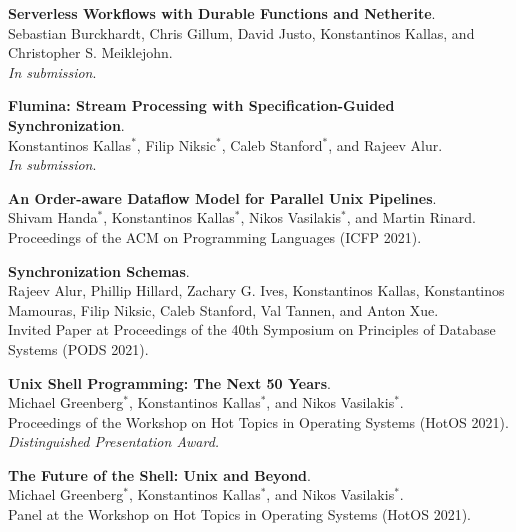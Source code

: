 \begin{minipage}{\textwidth}
\textbf{Serverless Workflows with Durable Functions and Netherite}. \\
Sebastian Burckhardt, Chris Gillum, David Justo, Konstantinos Kallas, and Christopher S. Meiklejohn. \\
\emph{In submission}.
\end{minipage}

\begin{minipage}{\textwidth}
\textbf{Flumina: Stream Processing with Specification-Guided Synchronization}. \\
Konstantinos Kallas$^*$, Filip Niksic$^*$, Caleb Stanford$^*$, and Rajeev Alur. \\
\emph{In submission}.
\end{minipage}

\begin{minipage}{\textwidth}
\textbf{An Order-aware Dataflow Model for Parallel Unix Pipelines}. \\
Shivam Handa$^*$, Konstantinos Kallas$^*$, Nikos Vasilakis$^*$, and Martin Rinard. \\
Proceedings of the ACM on Programming Languages (ICFP 2021).
\end{minipage}

\begin{minipage}{\textwidth}
\textbf{Synchronization Schemas}. \\
Rajeev Alur, Phillip Hillard, Zachary G. Ives, Konstantinos Kallas, Konstantinos Mamouras, Filip Niksic, Caleb Stanford, Val Tannen, and Anton Xue. \\
Invited Paper at Proceedings of the 40th Symposium on Principles of Database Systems (PODS 2021).
\end{minipage}

\begin{minipage}{\textwidth}
\textbf{Unix Shell Programming: The Next 50 Years}. \\
Michael Greenberg$^*$, Konstantinos Kallas$^*$, and Nikos Vasilakis$^*$. \\
Proceedings of the Workshop on Hot Topics in Operating Systems (HotOS 2021).\\
 \emph{Distinguished Presentation Award.}
\end{minipage}

\begin{minipage}{\textwidth}
\textbf{The Future of the Shell: Unix and Beyond}. \\
Michael Greenberg$^*$, Konstantinos Kallas$^*$, and Nikos Vasilakis$^*$. \\
Panel at the Workshop on Hot Topics in Operating Systems (HotOS 2021).
\end{minipage}

